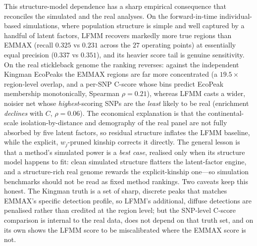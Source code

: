 \documentclass[11pt]{article}
\begin{document}
This structure-model dependence has a sharp empirical consequence that reconciles the
simulated and the real analyses. On the forward-in-time individual-based simulations, where population
structure is simple and well captured by a handful of latent factors, LFMM recovers markedly
more true regions than EMMAX (recall $0.325$ vs $0.231$ across the $27$ operating
points) at essentially equal precision ($0.337$ vs $0.351$), and its heavier score tail
is genuine sensitivity. On the real stickleback genome the ranking reverses:
against the independent Kingman EcoPeaks the EMMAX regions are far more concentrated
(a $19.5\times$ region-level overlap, and a per-SNP C-score whose bins predict EcoPeak
membership monotonically, Spearman $\rho = 0.21$), whereas LFMM casts a wider, noisier
net whose \emph{highest}-scoring SNPs are the \emph{least} likely to be real (enrichment
\emph{declines} with $C$, $\rho = 0.06$). The economical explanation is that the
continental-scale isolation-by-distance and demography of the real panel are not fully
absorbed by five latent factors, so residual structure inflates the LFMM baseline, while
the explicit, $w_j$-pruned kinship corrects it directly. The general lesson is that a
method's simulated power is a \emph{best case}, realised only when its structure model
happens to fit: clean simulated structure flatters the latent-factor engine, and a
structure-rich real genome rewards the explicit-kinship one---so simulation benchmarks
should not be read as fixed method rankings. Two caveats keep this honest. The Kingman
truth is a set of sharp, discrete peaks that matches EMMAX's specific detection profile,
so LFMM's additional, diffuse detections are penalised rather than credited at the region
level; but the SNP-level C-score comparison is internal to the real data, does not depend
on that truth set, and on its own shows the LFMM score to be miscalibrated where the
EMMAX score is not.
\end{document}
